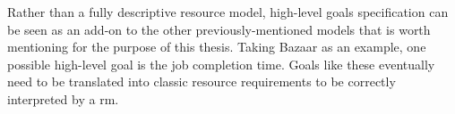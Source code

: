 Rather than a fully descriptive resource model, high-level goals specification can be seen as an add-on to the other previously-mentioned models that is worth mentioning for the purpose of this thesis.
Taking Bazaar \cite{bazaar} as an example, one possible high-level goal is the job completion time.
Goals like these eventually need to be translated into classic resource requirements to be correctly interpreted by a \gls{rm}.